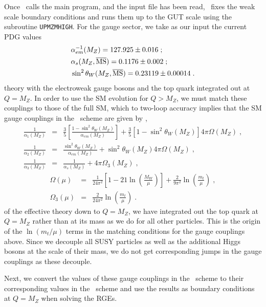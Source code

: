 Once \progisasug~calls the main program, and the input file has been
read, \progrge~fixes the weak scale boundary conditions and runs them up
to the GUT scale using the subroutine \texttt{UPMZMHIGH}. For the gauge
sector, we take as our input the current PDG values \cite{pdg} %
\begin{eqnarray*} &\alpha^{-1}_{em}(M_{Z})=127.925\pm0.016\;;\\
&\alpha_{s}(M_{Z},\overline{\mathrm{MS}})=0.1176\pm0.002\;;\\
&\sin^{2}{\theta_{W}}(M_{Z},\overline{\mathrm{MS}})=0.23119\pm0.00014\;.
\end{eqnarray*} %
theory with the electroweak gauge bosons and the top quark integrated
out at $Q=M_{Z}$. In order to use the SM evolution for $Q>M_{Z}$, we
must match these couplings to those of the full SM, which to two-loop
accuracy implies that the SM gauge couplings in the \msb~scheme are
given by \cite{weingandothers}, %
\begin{eqnarray}
\frac{1}{\alpha_{1}(M_{Z})}&=&\frac{3}{5}\left[\frac{1-\sin^{2}{\theta_{W}}(M_{Z})}{\alpha_{em}(M_{Z})}\right]+\frac{3}{5}\left[1-\sin^{2}{\theta_{W}}(M_{Z})\right]4\pi\Omega(M_{Z})\;,\\
\frac{1}{\alpha_{2}(M_{Z})}&=&\frac{\sin^{2}{\theta_{W}}(M_{Z})}{\alpha_{em}(M_{Z})}+\sin^{2}{\theta_{W}}(M_{Z})4\pi\Omega(M_{Z})\;,\\
\frac{1}{\alpha_{3}(M_{Z})}&=&\frac{1}{\alpha_{s}(M_{Z})}+4\pi\Omega_{3}(M_{Z})\;,
\end{eqnarray} %
\begin{eqnarray}
\Omega(\mu)&=&\frac{1}{24\pi^{2}}\left[1-21\ln{\left(\frac{M_{W}}{\mu}\right)}\right]+\frac{2}{9\pi^{2}}\ln{\left(\frac{m_t}{\mu}\right)}\;,\\
\Omega_{3}(\mu)&=&\frac{2}{24\pi^{2}}\ln{\left(\frac{m_{t}}{\mu}\right)}\;.
\end{eqnarray} %
of the effective theory down to $Q=M_Z$, we have integrated out the top
quark at $Q=M_Z$ rather than at its mass as we do for all other
particles.  This is the origin of the $\ln(m_t/\mu)$ terms in the
matching conditions for the gauge couplings above. Since we decouple all
SUSY particles as well as the additional Higgs bosons at the scale of
their mass, we do not get corresponding jumps in the gauge couplings as
these decouple.

Next, we convert the values of these gauge couplings in the
\msb~scheme to their corresponding values in the \drb~scheme and use the
results as boundary conditions at $Q=M_Z$ when solving the RGEs.

